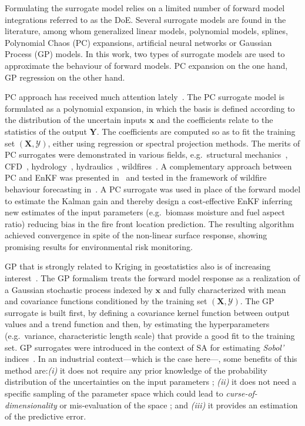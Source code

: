 Formulating the surrogate model relies on a limited number of forward model integrations referred to as the DoE. Several surrogate models are found in the literature, among whom generalized linear models, polynomial models, splines, Polynomial Chaos (PC) expansions, artificial neural networks or Gaussian Process (GP) models. In this work, two types of surrogate models are used to approximate the behaviour of forward models. PC expansion on the one hand, GP regression on the other hand. 

PC approach has received much attention lately~\citep{dubreuil2014,sudret2008,xiu2010,xiu2002,Ciriello2013}. The PC surrogate model is formulated as a polynomial expansion, in which the basis is defined according to the distribution of the uncertain inputs $\mathbf{x}$ and the coefficients relate to the statistics of the output $\mathbf{Y}$. The coefficients are computed so as to fit the training set $(\mathbf{X}, \mathcal{Y})$, either using regression or spectral projection methods. The merits of PC surrogates were demonstrated in various fields, e.g.~structural mechanics~\citep{dubreuil2014,berveiller2005}, CFD~\citep{hosder2006,lucor2007,saad2007phd}, hydrology~\citep{deman2015}, hydraulics~\citep{ge2008,elmocaydphd}, wildfires~\citep{rochoux2014}. A complementary approach between PC and EnKF was presented in~\citet{lixiu2009} and tested in the framework of wildfire behaviour forecasting in~\citet{rochoux2014}. A PC surrogate was used in place of the forward model to estimate the Kalman gain and thereby design a cost-effective EnKF inferring new estimates of the input parameters (e.g.~biomass moisture and fuel aspect ratio) reducing bias in the fire front location prediction. The resulting algorithm achieved convergence in spite of the non-linear surface response, showing promising results for environmental risk monitoring. 

GP that is strongly related to Kriging in geostatistics also is of increasing interest~\citep{rasmussen2006,legratiet2017,lockwood2012,marrel2015}. The GP formalism treats the forward model response as a realization of a Gaussian stochastic process indexed by $\mathbf{x}$ and fully characterized with mean and covariance functions conditioned by the training set $(\mathbf{X}, \mathcal{Y})$. The GP surrogate is built first, by defining a covariance kernel function between output values and a trend function and then, by estimating the hyperparameters (e.g.~variance, characteristic length scale) that provide a good fit to the training set. GP surrogates were introduced in the context of SA for estimating \emph{Sobol'} indices~\citep{oakley2004,marrel2009,legratiet2014}. In an industrial context---which is the case here---, some benefits of this method are:\textit{(i)} it does not require any prior knowledge of the probability distribution of the uncertainties on the input parameters ; \textit{(ii)} it does not need a specific sampling of the parameter space which could lead to \textit{curse-of-dimensionality} or mis-evaluation of the space ; and \textit{(iii)} it provides an estimation of the predictive error.

